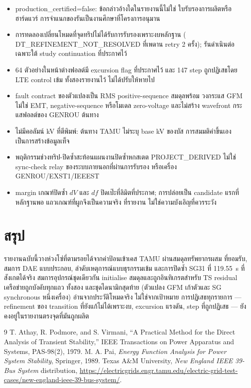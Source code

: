 \documentclass[12pt,a4paper]{article}
\newcommand{\code}[1]{{\ttfamily\small\hyphenchar\font=-1 #1}}
\begin{document}
\begin{itemize}
\item \code{production\_certified=false}: ข้อกล่าวอ้างใดในรายงานนี้ไม่ใช่
      ใบรับรองการผลิตหรือฮาร์ดแวร์ การจำแนกของรันเป็นงานศึกษาที่โครงการอนุมาน
\item การทดลองเปลี่ยนโหมดที่จุดทริปไม่ได้รับการรับรองเพราะงบหลักฐาน
      (\code{DT\_REFINEMENT\_NOT\_RESOLVED} ที่เพดาน retry 2 ครั้ง);
      รันดำเนินต่อเฉพาะใต้ study continuation ที่ประกาศไว้
\item 64 ตัวอย่างในหน้าต่างฟอลต์มี excursion flag ที่ประกาศไว้ และ
      147 step ถูกปฏิเสธโดย LTE control เข้ม ทั้งสองรายงานไว้ ไม่ได้ปรับให้หายไป
\item fault contract ของตัวแปลงเป็น RMS positive-sequence สมดุลพร้อม
      วงกระแส GFM ไม่ใช่ EMT, negative-sequence หรือโมเดล zero-voltage
      และไม่สร้าง wavefront กระแสฟอลต์ของ GENROU ต้นทาง
\item ไม่มีคอลัมน์ kV ที่ตีพิมพ์: ต้นทาง TAMU ไม่ระบุ base kV ของบัส
      การสมมติค่าขึ้นเองเป็นการสร้างข้อมูลเท็จ
\item พฤติกรรมช่วงทริป-ปิดซ้ำสะท้อนแผนงานปิดซ้ำหกสเตต PROJECT\_DERIVED
      ไม่ใช่ sync-check relay ของระบบภายนอกที่ผ่านการรับรอง
      หรือเครื่อง GENROU/EXST1/IEEEST
\item margin เกณฑ์ปิดซ้ำ $dV$ และ $df$ ปิดเป๊ะที่ลิมิตที่ประกาศ;
      การปล่อยเป็น candidate แรกที่หลักฐานพอ แถวเกณฑ์ที่ผูกจึงเป็นความจริง
      ที่รายงาน ไม่ใช่ความบังเอิญที่ควรระวัง
\end{itemize}

\section{สรุป}

รายงานฉบับนี้วางห่วงโซ่ที่ตามรอยได้จากค่าป้อนเข้าเคส TAMU ผ่านสมดุลทรัพยากรผสม
ที่ยอมรับ, สมการ DAE แบบประกอบ, ลำดับเหตุการณ์แบบธุรกรรมเข้ม
และการปิดซ้ำ SG31 ที่ 119.55~s ที่สังเกตได้จริง สมการอุปกรณ์ชุดเดียวกัน
initialise สมดุลและถูกอินทิเกรตสำหรับ TS residual เครือข่ายถูกบังคับทุกแถว
ทั้งสอง และชุดไดนามิกสุดท้าย (ตัวแปลง GFM เก้าตัวและ SG synchronous หนึ่งเครื่อง)
อ่านจากประวัติโหมดจริง ไม่ใช่จากเป้าหมาย การปฏิเสธทุกรายการ ---
refinement ของ transition ที่ยังแก้ไม่ได้เพราะงบ, excursion แรงดัน, step ที่ถูกปฏิเสธ
--- ยังคงอยู่ในรายงานตรงจุดที่มันถูกผลิต

\begin{thebibliography}{9}
 T. Athay, R. Podmore, and S. Virmani,
``A Practical Method for the Direct Analysis of Transient Stability,''
IEEE Transactions on Power Apparatus and Systems, PAS-98(2), 1979.
 M. A. Pai, \emph{Energy Function Analysis for Power System
Stability}, Springer, 1989.
 Texas A\&M University, \emph{New England IEEE 39-Bus System}
distribution,
\url{https://electricgrids.engr.tamu.edu/electric-grid-test-cases/new-england-ieee-39-bus-system/}.
\end{thebibliography}
\end{document}
